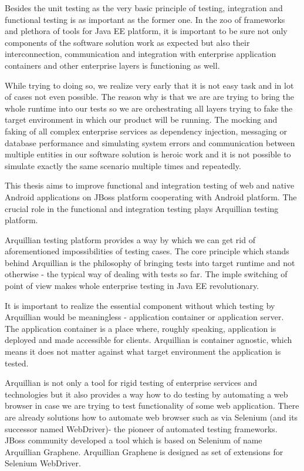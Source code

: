 \documentclass[12pt,final,oneside]{fithesis}
\begin{document}
Besides the unit testing as the very basic principle of testing, integration and functional testing is as important as the former one. In the zoo of frameworks and plethora of tools for Java EE platform, it is important to be sure not only components of the software solution work as expected but also their interconnection, communication and integration with enterprise application containers and other enterprise layers is functioning as well.

While trying to doing so, we realize very early that it is not easy task and in lot of cases not even possible. The reason why is that we are are trying to bring the whole runtime into our tests so we are orchestrating all layers trying to fake the target environment in which our product will be running. The mocking and faking of all complex enterprise services as dependency injection, messaging or database performance and simulating system errors and communication between multiple entities in our software solution is heroic work and it is not possible to simulate exactly the same scenario multiple times and repeatedly.

This thesis aims to improve functional and integration testing of web and native Android applications on JBoss platform cooperating with Android platform. The crucial role in the functional and integration testing plays Arquillian testing platform.

Arquillian testing platform provides a way by which we can get rid of aforementioned impossibilities of testing cases. The core principle which stands behind Arquillian is the philosophy of bringing tests into target runtime and not otherwise - the typical way of dealing with tests so far. The imple switching of point of view makes whole enterprise testing in Java EE revolutionary. 

It is important to realize the essential component without which testing by Arquillian would be meaningless - application container or application server. The application container is a place where, roughly speaking, application is deployed and made accessible for clients. Arquillian is container agnostic, which means it does not matter against what target environment the application is tested.

Arquillian is not only a tool for rigid testing of enterprise services and technologies but it also provides a way how to do testing by automating a web browser in case we are trying to test functionality of some web application. There are already solutions how to automate web browser such as via Selenium (and its successor named WebDriver)- the pioneer of automated testing frameworks. JBoss community developed a tool which is based on Selenium of name Arquillian Graphene. Arquillian Graphene is designed as set of extensions for Selenium WebDriver.
\end{document}

